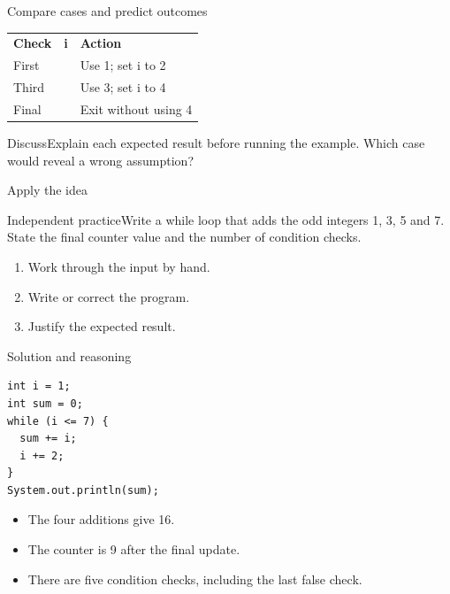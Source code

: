 \documentclass[10pt,aspectratio=169]{beamer}
\begin{document}
\begin{frame}[fragile,t]{Compare cases and predict outcomes}
\small\renewcommand{\arraystretch}{1.5}
\begin{tabularx}{\textwidth}{>{\raggedright\arraybackslash}X>{\raggedright\arraybackslash}X>{\raggedright\arraybackslash}X}\rowcolor{navy}
\color{white}\bfseries Check & \color{white}\bfseries i & \color{white}\bfseries Action\\
First & 1 & Use 1; set i to 2\\
Third & 3 & Use 3; set i to 4\\
Final & 4 & Exit without using 4\\
\end{tabularx}\par\vspace{3mm}\begin{exampleblock}{Discuss}Explain each expected result before running the example. Which case would reveal a wrong assumption?\end{exampleblock}
\end{frame}

\begin{frame}[fragile,t]{Apply the idea}
\begin{alertblock}{Independent practice}Write a while loop that adds the odd integers 1, 3, 5 and 7. State the final counter value and the number of condition checks.\end{alertblock}\vspace{3mm}\begin{enumerate}\item Work through the input by hand.\item Write or correct the program.\item Justify the expected result.\end{enumerate}
\end{frame}

\begin{frame}[fragile,t]{Solution and reasoning}
\begin{lstlisting}
int i = 1;
int sum = 0;
while (i <= 7) {
  sum += i;
  i += 2;
}
System.out.println(sum);
\end{lstlisting}\vspace{1mm}\small\begin{itemize}
\item The four additions give 16.
\item The counter is 9 after the final update.
\item There are five condition checks, including the last false check.
\end{itemize}
\end{frame}
\end{document}
